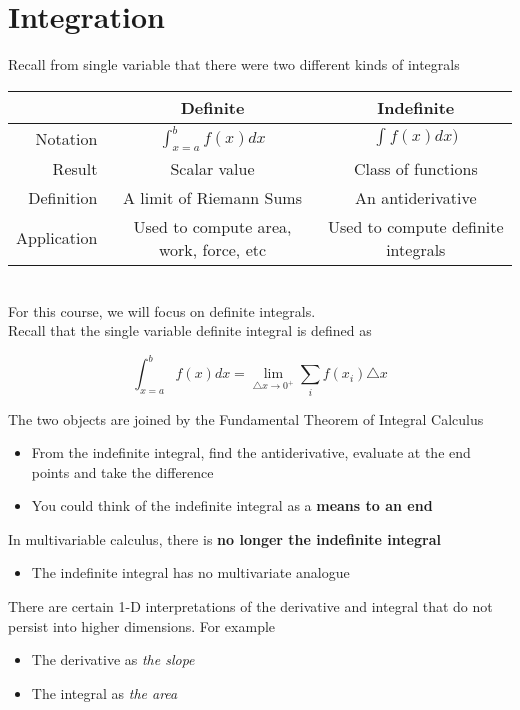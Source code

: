 \chapter{Integration}

Recall from single variable that there were two different kinds of integrals

\begin{tabular}{|r| c| c|}
   \hline
   & Definite & Indefinite \\
   \hline
   Notation & $ \int_{x = a}^{b} f(x) dx $ & $ \int_{}^{} f(x) dx) $\\ 
   \hline
   Result & Scalar value & Class of functions \\
   \hline
   Definition & A limit of Riemann Sums & An antiderivative \\
   \hline
   Application & Used to compute area, work, force, etc & Used to compute definite integrals \\
   \hline
\end{tabular}
\\
For this course, we will focus on definite integrals. \\

Recall that the single variable definite integral is defined as 
\begin{framed}
  

\[
   \int_{x=a}^{b}  f(x) dx = \lim \limits_{\triangle x \to 0^+} \sum \limits_{i} f(x_i) \triangle x 
\] 
\end{framed}

The two objects are joined by the Fundamental Theorem of Integral Calculus 
\begin{itemize}
   \item From the indefinite integral, find the antiderivative, evaluate at the end points and take the difference
   \item You could think of the indefinite integral as a \textbf{means to an end}
\end{itemize}

In multivariable calculus, there is \textbf{no longer the indefinite integral}
\begin{itemize}
   \item The indefinite integral has no multivariate analogue
\end{itemize}

There are certain 1-D interpretations of the derivative and integral that do not persist into higher dimensions. For example
\begin{itemize}
   \item The derivative as \textit{the slope}
   \item The integral as \textit{the area}
\end{itemize}

